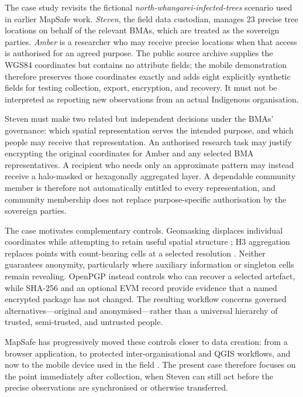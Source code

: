 \documentclass[a4paper,UKenglish,cleveref,autoref,thm-restate]{lipics-v2021}
\begin{document}
The case study revisits the fictional \textit{north-whangarei-infected-trees} scenario used in earlier MapSafe work. \textit{Steven}, the field data custodian, manages 23 precise tree locations on behalf of the relevant BMAs, which are treated as the sovereign parties. \textit{Amber} is a researcher who may receive precise locations when that access is authorised for an agreed purpose. The public source archive supplies the WGS84 coordinates but contains no attribute fields; the mobile demonstration therefore preserves those coordinates exactly and adds eight explicitly synthetic fields for testing collection, export, encryption, and recovery. It must not be interpreted as reporting new observations from an actual Indigenous organisation.

Steven must make two related but independent decisions under the BMAs' governance: which spatial representation serves the intended purpose, and which people may receive that representation. An authorised research task may justify encrypting the original coordinates for Amber and any selected BMA representatives. A recipient who needs only an approximate pattern may instead receive a halo-masked or hexagonally aggregated layer. A dependable community member is therefore not automatically entitled to every representation, and community membership does not replace purpose-specific authorisation by the sovereign parties.

The case motivates complementary controls. Geomasking displaces individual coordinates while attempting to retain useful spatial structure \citep{armstrong1999geographically,zandbergen2014ensuring,swanlund2020maskmy}; H3 aggregation replaces points with count-bearing cells at a selected resolution \citep{sahr2003geodesic,uber2018h3}. Neither guarantees anonymity, particularly where auxiliary information or singleton cells remain revealing. OpenPGP instead controls who can recover a selected artefact, while SHA-256 and an optional EVM record provide evidence that a named encrypted package has not changed. The resulting workflow concerns governed alternatives---original and anonymised---rather than a universal hierarchy of trusted, semi-trusted, and untrusted people.

MapSafe has progressively moved these controls closer to data creation: from a browser application, to protected inter-organisational and QGIS workflows, and now to the mobile device used in the field \citep{sharma2023mapsafe,sharma2024indigenous,sharma2025mapsafe}. The present case therefore focuses on the point immediately after collection, when Steven can still act before the precise observations are synchronised or otherwise transferred.
\end{document}
